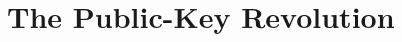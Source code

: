 \documentclass[../main]{subfiles}
\begin{document}
\chapter{The Public-Key Revolution}
\end{document}
